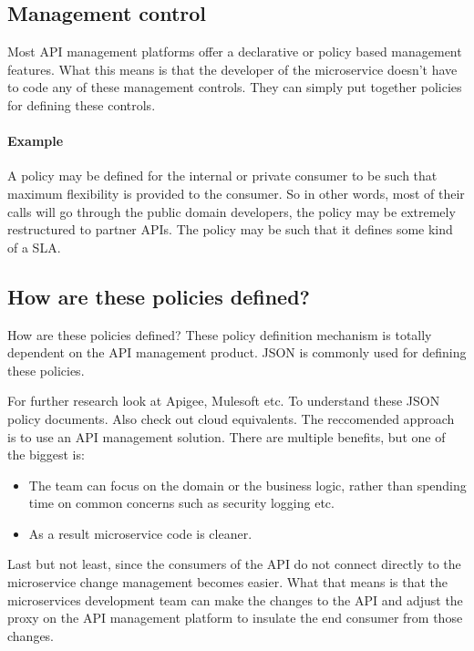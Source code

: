 \documentclass[a4paper, 11pt]{book}
\begin{document}
    \subsection{Management control}
    Most API management platforms offer a declarative or policy based management features.
    What this means is that the developer of the microservice doesn't have to code any of these management controls.
    They can simply put together policies for defining these controls.

    \paragraph{Example} A policy may be defined for the internal or private consumer to be such that maximum flexibility is provided to the consumer.
    So in other words, most of their calls will go through the public domain developers, the policy may be extremely restructured to partner APIs.
    The policy may be such that it defines some kind of a SLA.

    \subsection{How are these policies defined?}
    How are these policies defined?
    These policy definition mechanism is totally dependent on the API management product.
    JSON is commonly used for defining these policies.

    For further research look at Apigee, Mulesoft etc.
    To understand these JSON policy documents. Also check out cloud equivalents.
    The reccomended approach is to use an API management solution.
    There are multiple benefits, but one of the biggest is:
    \begin{itemize}
        \item The team can focus on the domain or the business logic, rather than spending time on common concerns such as security logging etc.
        \item As a result microservice code is cleaner.
    \end{itemize}

    Last but not least, since the consumers of the API do not connect directly to the microservice change management becomes easier.
    What that means is that the microservices development team can make the changes to the API and adjust the proxy on the API management platform to insulate the end consumer from those changes.
\end{document}
